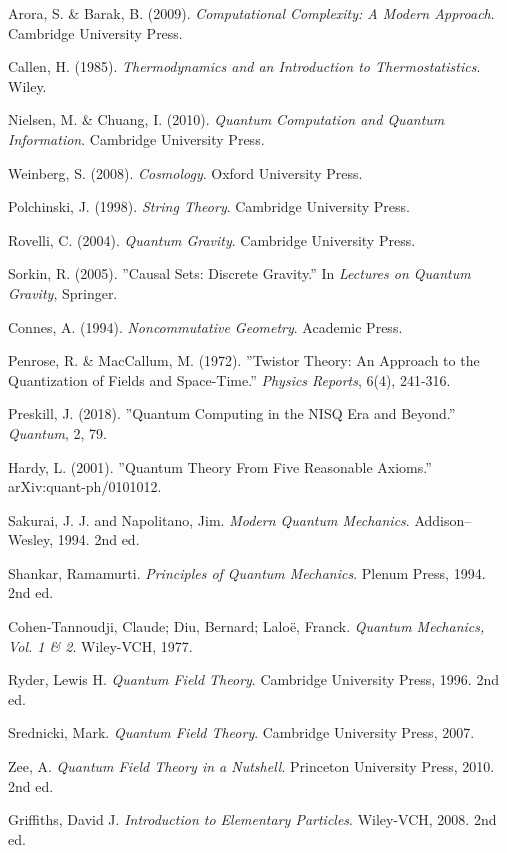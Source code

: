 \documentclass[11pt,a4paper]{article}
\begin{document}
\begin{enumerate}[label={[\arabic*]}]
    \item Arora, S. \& Barak, B. (2009). \textit{Computational Complexity: A Modern Approach}. Cambridge University Press.
    \item Callen, H. (1985). \textit{Thermodynamics and an Introduction to Thermostatistics}. Wiley.
    \item Nielsen, M. \& Chuang, I. (2010). \textit{Quantum Computation and Quantum Information}. Cambridge University Press.
    \item Weinberg, S. (2008). \textit{Cosmology}. Oxford University Press.
    \item Polchinski, J. (1998). \textit{String Theory}. Cambridge University Press.
    \item Rovelli, C. (2004). \textit{Quantum Gravity}. Cambridge University Press.
    \item Sorkin, R. (2005). ”Causal Sets: Discrete Gravity.” In \textit{Lectures on Quantum Gravity}, Springer.
    \item Connes, A. (1994). \textit{Noncommutative Geometry}. Academic Press.
    \item Penrose, R. \& MacCallum, M. (1972). ”Twistor Theory: An Approach to the Quantization of Fields and Space-Time.” \textit{Physics Reports}, 6(4), 241-316.
    \item Preskill, J. (2018). ”Quantum Computing in the NISQ Era and Beyond.” \textit{Quantum}, 2, 79.
    \item Hardy, L. (2001). ”Quantum Theory From Five Reasonable Axioms.” arXiv:quant-ph/0101012.
    \item Sakurai, J. J. and Napolitano, Jim. \textit{Modern Quantum Mechanics}. Addison–Wesley, 1994. 2nd ed.
    \item Shankar, Ramamurti. \textit{Principles of Quantum Mechanics}. Plenum Press, 1994. 2nd ed.
    \item Cohen-Tannoudji, Claude; Diu, Bernard; Laloë, Franck. \textit{Quantum Mechanics, Vol. 1 \& 2}. Wiley-VCH, 1977.
    \item Ryder, Lewis H. \textit{Quantum Field Theory}. Cambridge University Press, 1996. 2nd ed.
    \item Srednicki, Mark. \textit{Quantum Field Theory}. Cambridge University Press, 2007.
    \item Zee, A. \textit{Quantum Field Theory in a Nutshell}. Princeton University Press, 2010. 2nd ed.
    \item Griffiths, David J. \textit{Introduction to Elementary Particles}. Wiley-VCH, 2008. 2nd ed.

\end{enumerate}
\end{document}
